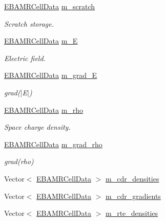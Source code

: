 \begin{DoxyCompactItemize}
\item 
\hyperlink{type__definitions_8H_a7e610f301989e5e07781c5e338bdb7c3}{E\+B\+A\+M\+R\+Cell\+Data} \hyperlink{classfull__tagger_aff6a219319b146ec4b9f9bc7945e7907}{m\+\_\+scratch}
\begin{DoxyCompactList}\small\item\em Scratch storage. \end{DoxyCompactList}\item 
\hyperlink{type__definitions_8H_a7e610f301989e5e07781c5e338bdb7c3}{E\+B\+A\+M\+R\+Cell\+Data} \hyperlink{classfull__tagger_a2dfbab8e9cb17d3f8319ac669612f30e}{m\+\_\+E}
\begin{DoxyCompactList}\small\item\em Electric field. \end{DoxyCompactList}\item 
\hyperlink{type__definitions_8H_a7e610f301989e5e07781c5e338bdb7c3}{E\+B\+A\+M\+R\+Cell\+Data} \hyperlink{classfull__tagger_a47a6b3021e4ceb00360c496881dbc978}{m\+\_\+grad\+\_\+E}
\begin{DoxyCompactList}\small\item\em grad($\vert$\+E$\vert$) \end{DoxyCompactList}\item 
\hyperlink{type__definitions_8H_a7e610f301989e5e07781c5e338bdb7c3}{E\+B\+A\+M\+R\+Cell\+Data} \hyperlink{classfull__tagger_ab0ec280ebb487d3b66407f1048a09055}{m\+\_\+rho}
\begin{DoxyCompactList}\small\item\em Space charge density. \end{DoxyCompactList}\item 
\hyperlink{type__definitions_8H_a7e610f301989e5e07781c5e338bdb7c3}{E\+B\+A\+M\+R\+Cell\+Data} \hyperlink{classfull__tagger_aefcdba0874e19b2a38ee3c3bb5d2c63d}{m\+\_\+grad\+\_\+rho}
\begin{DoxyCompactList}\small\item\em grad(rho) \end{DoxyCompactList}\item 
Vector$<$ \hyperlink{type__definitions_8H_a7e610f301989e5e07781c5e338bdb7c3}{E\+B\+A\+M\+R\+Cell\+Data} $>$ \hyperlink{classfull__tagger_a0312392573aad822051b27c8aac92acf}{m\+\_\+cdr\+\_\+densities}
\item 
Vector$<$ \hyperlink{type__definitions_8H_a7e610f301989e5e07781c5e338bdb7c3}{E\+B\+A\+M\+R\+Cell\+Data} $>$ \hyperlink{classfull__tagger_a3ad6b7bdf7e5fe06259e889084c7ee10}{m\+\_\+cdr\+\_\+gradients}
\item 
Vector$<$ \hyperlink{type__definitions_8H_a7e610f301989e5e07781c5e338bdb7c3}{E\+B\+A\+M\+R\+Cell\+Data} $>$ \hyperlink{classfull__tagger_a769e3790de596ce3e0cfbca85ba1196c}{m\+\_\+rte\+\_\+densities}
\end{DoxyCompactItemize}


